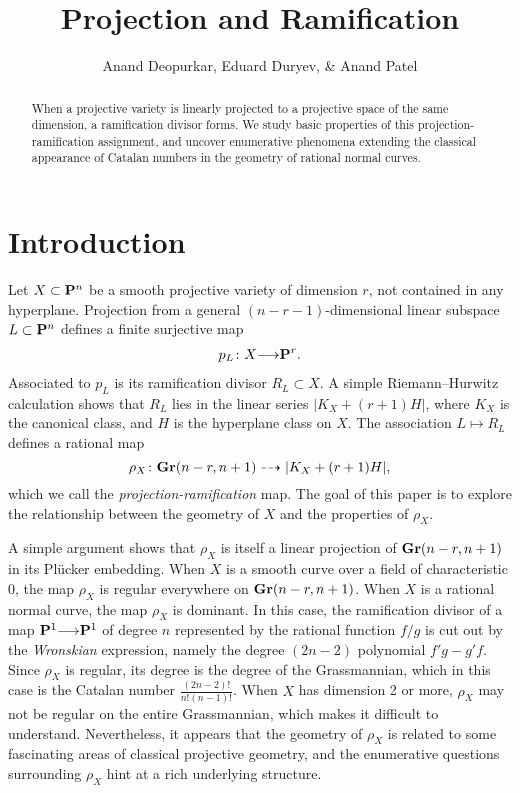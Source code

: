 \documentclass[11pt,reqno]{amsart}
\title{Projection and Ramification}
\author{Anand Deopurkar, Eduard Duryev, \& Anand Patel}
\theoremstyle{plain}
\theoremstyle{definition}
\theoremstyle{remark}
\numberwithin{equation}{section}
\renewcommand{\to}{{\longrightarrow}}
\numberwithin{equation}{section}
\begin{document}
\begin{abstract}
    When a projective variety is linearly projected to a projective space of the same dimension, a ramification divisor forms. We study basic properties of this projection-ramification assignment, and uncover enumerative phenomena extending the classical appearance of Catalan numbers in the geometry of rational normal curves.
\end{abstract}


\maketitle
\tableofcontents


\section{Introduction}\label{sec:intro}
Let $X \subset \P^n$ be a smooth projective variety of dimension $r$, not contained in any hyperplane.
Projection from a general $(n-r-1)$-dimensional linear subspace $L \subset \P^n$ defines a finite surjective map
\begin{align*}
  p_{L}\from X \to \P^{r}.
\end{align*}
Associated to $p_L$ is its ramification divisor $R_L \subset X$.
A simple Riemann--Hurwitz calculation shows that $R_L$ lies in the linear series $|K_X + (r+1)H|$, where $K_X$ is the canonical class, and $H$ is the hyperplane class on $X$.
The association $L \mapsto R_L$ defines a rational map
\[ \rho_X \from \Gr(n-r, n+1) \dashrightarrow |K_X + (r+1)H|, \]
which we call the \emph{projection-ramification} map.
The goal of this paper is to explore the relationship between the geometry of $X$ and the properties of $\rho_X$.

A simple argument shows that $\rho_X$ is itself a linear projection of $\Gr(n-r, n+1)$ in its Pl\"ucker embedding.
When $X$ is a smooth curve over a field of characteristic $0$, the map $\rho_X$ is regular everywhere on $\Gr(n-r, n+1)$.
When $X$ is a rational normal curve, the map $\rho_X$ is dominant.
In this case, the ramification divisor of a map $\P^1 \to \P^1$ of degree $n$ represented by the rational function $f/g$ is cut out by the \emph{Wronskian} expression, namely the degree $(2n-2)$ polynomial $f'g - g'f$.
Since $\rho_X$ is regular, its degree is the degree of the Grassmannian, which in this case is the Catalan number $\frac{(2n-2)!}{n!(n-1)!}$.
When $X$ has dimension 2 or more, $\rho_X$ may not be regular on the entire Grassmannian, which makes it difficult to understand.
Nevertheless, it appears that the geometry of $\rho_X$ is related to some fascinating areas of classical projective geometry, and the enumerative questions surrounding $\rho_X$ hint at a rich underlying structure. 
\end{document}
